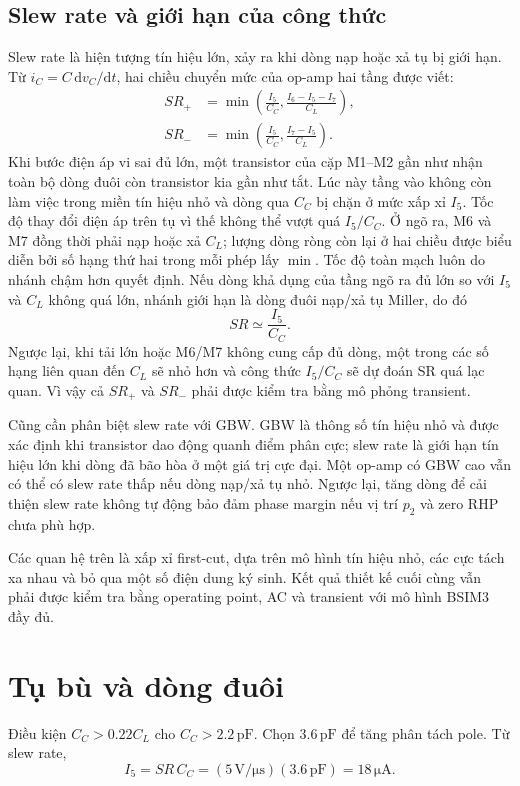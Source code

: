 \documentclass[11pt,a4paper]{report}
\newcommand{\SI}[2]{\ensuremath{#1\,\mathrm{#2}}}
\newcommand{\micro}{\mu}\newcommand{\dd}{\mathrm d}\newcommand{\ohm}{\Omega}
\begin{document}
\subsection{Slew rate và giới hạn của công thức}
Slew rate là hiện tượng tín hiệu lớn, xảy ra khi dòng nạp hoặc xả tụ bị giới hạn.
Từ $i_C=C\,\dd v_C/\dd t$, hai chiều chuyển mức của op-amp hai tầng được viết:
\begin{align}
SR_+&=\min\!\left(\frac{I_5}{C_C},
\frac{I_6-I_5-I_7}{C_L}\right),\\
SR_-&=\min\!\left(\frac{I_5}{C_C},
\frac{I_7-I_5}{C_L}\right).
\end{align}
Khi bước điện áp vi sai đủ lớn, một transistor của cặp M1--M2 gần như nhận toàn
bộ dòng đuôi còn transistor kia gần như tắt. Lúc này tầng vào không còn làm việc
trong miền tín hiệu nhỏ và dòng qua $C_C$ bị chặn ở mức xấp xỉ $I_5$. Tốc độ
thay đổi điện áp trên tụ vì thế không thể vượt quá $I_5/C_C$. Ở ngõ ra, M6 và
M7 đồng thời phải nạp hoặc xả $C_L$; lượng dòng ròng còn lại ở hai chiều được
biểu diễn bởi số hạng thứ hai trong mỗi phép lấy $\min$. Tốc độ toàn mạch luôn
do nhánh chậm hơn quyết định.
Nếu dòng khả dụng của tầng ngõ ra đủ lớn so với $I_5$ và $C_L$ không quá lớn,
nhánh giới hạn là dòng đuôi nạp/xả tụ Miller, do đó
\begin{equation}
\boxed{SR\simeq\frac{I_5}{C_C}}.
\end{equation}
Ngược lại, khi tải lớn hoặc M6/M7 không cung cấp đủ dòng, một trong các số hạng
liên quan đến $C_L$ sẽ nhỏ hơn và công thức $I_5/C_C$ sẽ dự đoán SR quá lạc
quan. Vì vậy cả $SR_+$ và $SR_-$ phải được kiểm tra bằng mô phỏng transient.

Cũng cần phân biệt slew rate với GBW. GBW là thông số tín hiệu nhỏ và được xác
định khi transistor dao động quanh điểm phân cực; slew rate là giới hạn tín hiệu
lớn khi dòng đã bão hòa ở một giá trị cực đại. Một op-amp có GBW cao vẫn có thể
có slew rate thấp nếu dòng nạp/xả tụ nhỏ. Ngược lại, tăng dòng để cải thiện slew
rate không tự động bảo đảm phase margin nếu vị trí $p_2$ và zero RHP chưa phù
hợp.

Các quan hệ trên là xấp xỉ first-cut, dựa trên mô hình tín hiệu nhỏ, các cực tách
xa nhau và bỏ qua một số điện dung ký sinh. Kết quả thiết kế cuối cùng vẫn phải
được kiểm tra bằng operating point, AC và transient với mô hình BSIM3 đầy đủ.

\section{Tụ bù và dòng đuôi}
Điều kiện $C_C>0.22C_L$ cho $C_C>\SI{2.2}{pF}$. Chọn \SI{3.6}{pF} để tăng phân tách pole. Từ slew rate,
\begin{equation}I_5=SR\,C_C=(\SI{5}{V/\micro s})(\SI{3.6}{pF})=\boxed{\SI{18}{\micro A}}.\end{equation}
\end{document}
